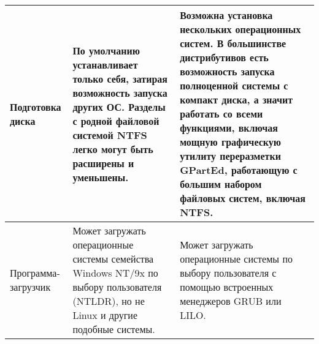 \documentclass[14pt]{article}
\begin{document}
\begin{table}[H]
\begin{tabularx}{\textwidth}{|X|X|X|}
            \hline
            Подготовка диска & По умолчанию устанавливает только себя, затирая возможность запуска других ОС. Разделы с родной файловой системой NTFS легко могут быть расширены и уменьшены. & Возможна установка нескольких операционных систем. В большинстве дистрибутивов есть возможность запуска полноценной системы с компакт диска, а значит работать со всеми функциями, включая мощную графическую утилиту переразметки GPartEd, работающую с большим набором файловых систем, включая NTFS. \\
            \hline
            Программа-загрузчик & Может загружать операционные системы семейства Windows NT/9x по выбору пользователя (NTLDR), но не Linux и другие подобные системы. & Может загружать операционные системы по выбору пользователя с помощью встроенных менеджеров GRUB или LILO. \\
            \hline
        \end{tabularx}
    \end{table}

    \newpage
\end{document}

